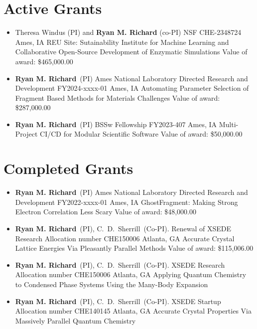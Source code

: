 \documentclass[11pt,a4paper,sans]{moderncv}
\begin{document}
\section{Active Grants}
\vspace{5pt}
\begin{itemize}
	\item{
		{Theresa Windus (PI) and \textbf{Ryan M. Richard} (co-PI)}
		{NSF CHE-2348724}
		{Ames, IA}
		{}
		{REU Site: Sutainability Institute for Machine Learning and 
		 Collaborative Open-Source Development of Enzymatic Simulations}
		{Value of award: \$465,000.00}
		{}
	}

	\item{
		{\textbf{Ryan M. Richard}\ (PI)}
		{Ames National Laboratory Directed Research and Development
         FY2024-xxxx-01}
		{Ames, IA}
		{}
		{Automating Parameter Selection of Fragment Based Methods for Materials
		Challenges}
		{Value of award: \$287,000.00}
		{}
	}
	\item{
		{\textbf{Ryan M. Richard}\ (PI)}
		{BSSw Fellowship FY2023-407}
		{Ames, IA}
		{}
		{Multi-Project CI/CD for Modular Scientific Software}
		{Value of award: \$50,000.00}
		{}
	}
\end{itemize}

\section{Completed Grants}
\vspace{5pt}
\begin{itemize}
	\item{
		{\textbf{Ryan M. Richard}\ (PI)}
		{Ames National Laboratory Directed Research and Development
         FY2022-xxxx-01}
		{Ames, IA}
		{}
		{GhostFragment: Making Strong Electron Correlation Less Scary}
		{Value of award: \$48,000.00}
		{}
	}
	\item{
          {\textbf{Ryan M. Richard}\ (PI), C.~D.~Sherrill\ (Co-PI).}
          {Renewal of XSEDE Research Allocation number CHE150006}
          {Atlanta, GA}
          {}
          {Accurate Crystal Lattice Energies Via Pleasantly Parallel Methods}
          {Value of award: \$115,006.00}
          {}}
	\item{
          {\textbf{Ryan M. Richard}\ (PI), C.~D.~Sherrill\ (Co-PI).}
          {XSEDE Research Allocation number CHE150006}
          {Atlanta, GA}
          {}
          {Applying Quantum Chemistry to Condensed Phase Systems Using the
		  Many-Body Expansion}
          {}
          {}}
	\item{
          {\textbf{Ryan M. Richard}\ (PI), C.~D.~Sherrill\ (Co-PI).}
          {XSEDE Startup Allocation number CHE140145}
          {Atlanta, GA}
          {}
          {Accurate Crystal Properties Via Massively Parallel Quantum Chemistry}
          {}
          {}}
\end{itemize}
\end{document}
